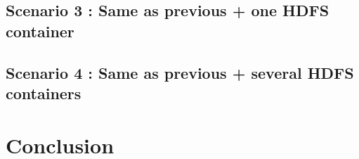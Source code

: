 \documentclass{article}
\begin{document}
\subsection{Scenario 3 : Same as previous + one HDFS container}

\subsection{Scenario 4 : Same as previous + several HDFS containers}

\section{Conclusion}
\end{document}
